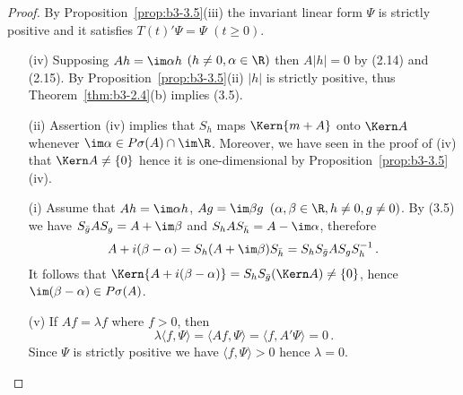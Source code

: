 \begin{proof}
	By Proposition~\ref{prop:b3-3.5}(iii) the invariant linear form $\Psi$ is strictly positive and it satisfies $T(t)'\Psi = \Psi$ $(t \geq 0)$.
	\begin{enumerate}[wide]
	\item[(iv)] 
	Supposing $Ah = \im\alpha h$ $(h \neq 0, \alpha \in \R)$ then $A|h| = 0$ by (2.14) and (2.15).
	By Proposition~\ref{prop:b3-3.5}(ii) $|h|$ is strictly positive, thus Theorem~\ref{thm:b3-2.4}(b) implies (3.5).
	
	\item[(ii)] 
	Assertion (iv) implies that $S_{h}$ maps $\Kern{m + A}$ onto $\Kern A$ whenever $\im \alpha \in P\sigma(A)\cap \im\R$.
	Moreover, we have seen in the proof of (iv) that $\Kern A \neq \{0\}$ hence it is one-dimensional by Proposition~\ref{prop:b3-3.5}(iv).
	
	\item[(i)] 
	Assume that $Ah = \im\alpha h$, $Ag = \im\beta g$ $(\alpha,\beta \in \R, h \neq 0, g \neq 0)$.
	By (3.5) we have $S_{\bar{g}}A S_{g} = A + \im\beta$ and $S_{h}A S_{\bar{h}} = A - \im\alpha$, therefore
	\begin{equation}\label{eq:b3-3.6}
	A + i(\beta - \alpha) = S_{h}(A + \im\beta)S_{\bar{h}} = S_{h}S_{\bar{g}}A S_{g}S_{h}^{-1}\,.
	\end{equation}
	It follows that $\Kern{A + i(\beta - \alpha)} = S_{h}S_{\bar{g}}(\Kern A) \neq \{0\}$, hence $\im (\beta - \alpha) \in P\sigma(A)$.
	
	\item[(v)] 
	If $Af = \lambda f$ where $f > 0$, then
	\begin{equation}\label{eq:b3-3.7}
	\lambda\langle f,\Psi\rangle = \langle Af,\Psi\rangle = \langle f,A'\Psi\rangle = 0\,.
	\end{equation}
	Since $\Psi$ is strictly positive we have $\langle f,\Psi\rangle > 0$ hence $\lambda = 0$.
	

\end{enumerate}
\end{proof}
